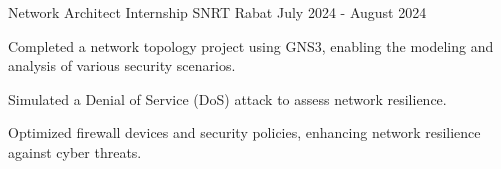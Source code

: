 

\begin{cventries}

  \cventry
    {Network Architect Internship} %
    {SNRT} %
    {Rabat} %
    {July 2024 - August 2024} %
    {
      \begin{cvitems} %
        \item {Completed a network topology project using GNS3, enabling the modeling and analysis of various security scenarios.}
        \item {Simulated a Denial of Service (DoS) attack to assess network resilience.}
        \item {Optimized firewall devices and security policies, enhancing network resilience against cyber threats.}
      \end{cvitems}
    }
\end{cventries}
